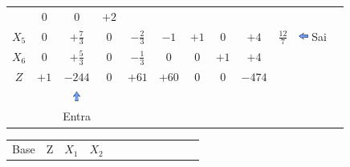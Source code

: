 \begin{frame}
{\begin{table}
\begin{tabular}{c c c c c c c c c c c c}
				& \cellcolor{yellow!50} $\scriptstyle 0$
				& \cellcolor{yellow!50} $\scriptstyle 0$
				& \cellcolor{gray!50} $\scriptstyle +2$ \\
			    \cellcolor{blue!100} \color{red} $\scriptstyle X_5$
				& \cellcolor{gray!50} $\scriptstyle 0$
				& \cellcolor{red!50} $\scriptstyle +\frac{7}{3}$
				& \cellcolor{gray!50} $\scriptstyle 0$
				& \cellcolor{gray!50} $\scriptstyle -\frac{2}{3}$			
				& \cellcolor{gray!50} $\scriptstyle -1$
				& \cellcolor{gray!50} $\scriptstyle +1$
				& \cellcolor{gray!50} $\scriptstyle 0$ 
				& \cellcolor{gray!50} $\scriptstyle +4$ 
				& $ \scriptstyle \frac{12}{7}$ & \includegraphics[width=0.3cm,height=0.3cm]{setaesquerda.jpg} \scriptsize Sai \\
				\cellcolor{blue!100} \color{red} $\scriptstyle X_6$
				& \cellcolor{yellow!50} $\scriptstyle 0$
				& \cellcolor{gray!50} $\scriptstyle +\frac{5}{3}$
				& \cellcolor{yellow!50} $\scriptstyle 0$
				& \cellcolor{yellow!50} $\scriptstyle -\frac{1}{3}$
				& \cellcolor{yellow!50} $\scriptstyle 0$
				& \cellcolor{yellow!50} $\scriptstyle 0$
				& \cellcolor{yellow!50} $\scriptstyle +1$
				& \cellcolor{gray!50} $\scriptstyle +4$\\
				\cellcolor{blue!100} \color{white} $\scriptstyle Z$
				& \cellcolor{yellow!50} $\scriptstyle +1$
				& \cellcolor{gray!50} $\scriptstyle -244$
				& \cellcolor{yellow!50} $\scriptstyle 0$
				& \cellcolor{yellow!50} $\scriptstyle +61$
				& \cellcolor{yellow!50} $\scriptstyle +60$
				& \cellcolor{yellow!50} $\scriptstyle 0$
				& \cellcolor{yellow!50} $\scriptstyle 0$ 
				& \cellcolor{gray!50} $\scriptstyle -474$  \\
				& & \includegraphics[width=0.3cm,height=0.3cm]{setacima.jpg} \\
				& & \scriptsize Entra \\
			\end{tabular}
		\end{table}			
	}
	{
		\begin{table}		
			\begin{tabular}{c c c c c c c c c c c c}
				\cellcolor{blue!100} \color{white} \scriptsize Base 
				&\cellcolor{blue!100} \color{red} \scriptsize Z 
				&\cellcolor{blue!100} \color{red} $\scriptstyle X_1$ 
				&\cellcolor{blue!100} \color{red} $\scriptstyle X_2$ 

\end{tabular}
\end{table}}
\end{frame}
